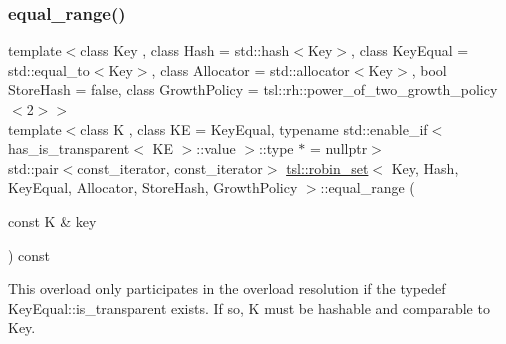 \subsubsection{\texorpdfstring{equal\_range()}{equal\_range()}\hspace{0.1cm}{\footnotesize\ttfamily [5/6]}}
{\footnotesize\ttfamily template$<$class Key , class Hash  = std\+::hash$<$\+Key$>$, class Key\+Equal  = std\+::equal\+\_\+to$<$\+Key$>$, class Allocator  = std\+::allocator$<$\+Key$>$, bool Store\+Hash = false, class Growth\+Policy  = tsl\+::rh\+::power\+\_\+of\+\_\+two\+\_\+growth\+\_\+policy$<$2$>$$>$ \\
template$<$class K , class KE  = Key\+Equal, typename std\+::enable\+\_\+if$<$ has\+\_\+is\+\_\+transparent$<$ K\+E $>$\+::value $>$\+::type $\ast$  = nullptr$>$ \\
std\+::pair$<$const\+\_\+iterator, const\+\_\+iterator$>$ \mbox{\hyperlink{classtsl_1_1robin__set}{tsl\+::robin\+\_\+set}}$<$ Key, Hash, Key\+Equal, Allocator, Store\+Hash, Growth\+Policy $>$\+::equal\+\_\+range (\begin{DoxyParamCaption}\item[{const K \&}]{key }\end{DoxyParamCaption}) const\hspace{0.3cm}{\ttfamily [inline]}}





This overload only participates in the overload resolution if the typedef Key\+Equal\+::is\+\_\+transparent exists. If so, K must be hashable and comparable to Key. \mbox{\label{classtsl_1_1robin__set_a2ca1a7918565492dcc5a870186220985}} 

